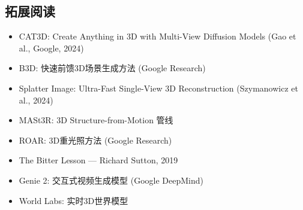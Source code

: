 \subsection{拓展阅读}

\begin{itemize}
    \item CAT3D: Create Anything in 3D with Multi-View Diffusion Models (Gao et al., Google, 2024)
    \item B3D: 快速前馈3D场景生成方法 (Google Research)
    \item Splatter Image: Ultra-Fast Single-View 3D Reconstruction (Szymanowicz et al., 2024)
    \item MASt3R: 3D Structure-from-Motion 管线
    \item ROAR: 3D重光照方法 (Google Research)
    \item The Bitter Lesson --- Richard Sutton, 2019
    \item Genie 2: 交互式视频生成模型 (Google DeepMind)
    \item World Labs: 实时3D世界模型
\end{itemize}



